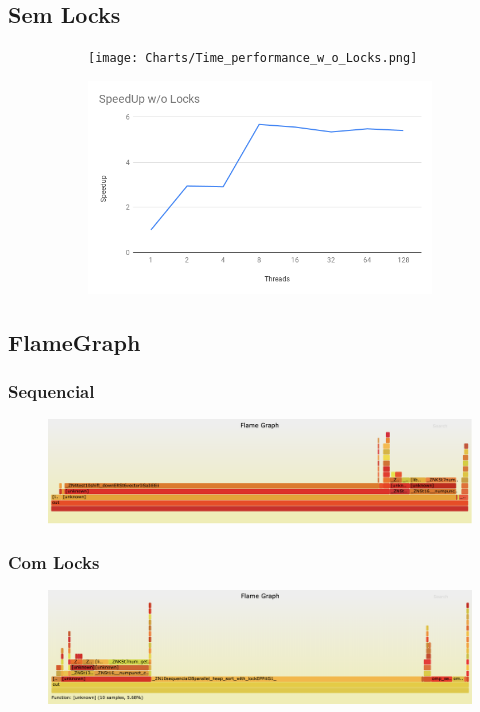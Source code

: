 \documentclass{article}
\begin{document}
\subsection{Sem Locks}
\begin{figure}[!htb]
  \centering
  \begin{subfigure}{.5\textwidth}
    \centering
    \texttt{[image: Charts/Time\_performance\_w\_o\_Locks.png]}

  \end{subfigure}%
  \begin{subfigure}{.5\textwidth}
    \centering
    \includegraphics[width=.9\linewidth]{Charts/SpeedUp_w_o_Locks.png}
  \end{subfigure}
\end{figure}


\subsection{FlameGraph}

\subsubsection{Sequencial}
\begin{figure}[!htb]
  \centering
  \includegraphics[width=.9\linewidth]{seq.png}
\end{figure}

\subsubsection{Com Locks}
\begin{figure}[!htb]
  \centering
  \includegraphics[width=.9\linewidth]{clocks.png}
\end{figure}
\end{document}

